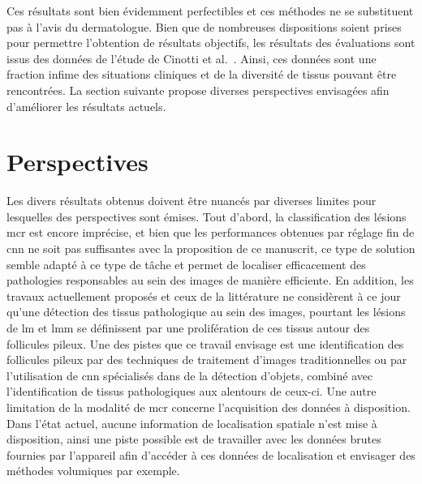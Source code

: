 Ces résultats sont bien évidemment perfectibles et ces méthodes ne se substituent pas à l'avis du dermatologue. Bien que de nombreuses dispositions soient prises pour permettre l'obtention de résultats objectifs, les résultats des évaluations sont issus des données de l'étude de Cinotti et al.~\cite{Cinotti2016}. Ainsi, ces données sont une fraction infime des situations cliniques et de la diversité de tissus pouvant être rencontrées. La section suivante propose diverses perspectives envisagées afin d'améliorer les résultats actuels.\par
\clearpage

\section*{Perspectives}
Les divers résultats obtenus doivent être nuancés par diverses limites pour lesquelles des perspectives sont émises. Tout d'abord, la classification des lésions \gls{mcr} est encore imprécise, et bien que les performances obtenues par réglage fin de \gls{cnn} ne soit pas suffisantes avec la proposition de ce manuscrit, ce type de solution semble adapté à ce type de tâche et permet de localiser efficacement des pathologies responsables au sein des images de manière efficiente. En addition, les travaux actuellement proposés et ceux de la littérature ne considèrent à ce jour qu'une détection des tissus pathologique au sein des images, pourtant les lésions de \gls{lm} et \gls{lmm} se définissent par une prolifération de ces tissus autour des follicules pileux. Une des pistes que ce travail envisage est une identification des follicules pileux par des techniques de traitement d'images traditionnelles ou par l'utilisation de \gls{cnn} spécialisés dans de la détection d'objets, combiné avec l'identification de tissus pathologiques aux alentours de ceux-ci. Une autre limitation de la modalité de \gls{mcr} concerne l'acquisition des données à disposition. Dans l'état actuel, aucune information de localisation spatiale n'est mise à disposition, ainsi une piste possible est de travailler avec les données brutes fournies par l'appareil afin d'accéder à ces données de localisation et envisager des méthodes volumiques par exemple.\par

